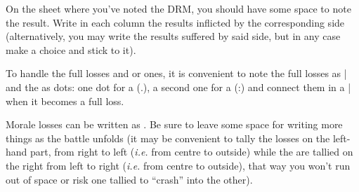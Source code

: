 \begin{playtip}
  On the sheet where you've noted the DRM, you should have some space to note
  the result. Write in each column the results inflicted by the corresponding
  side (alternatively, you may write the results suffered by said side, but in
  any case make a choice and stick to it).

  To handle the full losses and \texttu or \texttd ones, it is convenient to
  note the full losses as | and the  as dots: one dot for a \texttu
  (.), a second one for a \texttd (:) and connect them in a | when it becomes
  a full loss.

  Morale losses can be written as \textetoile. Be sure to leave some space for
  writing more things as the battle unfolds (it may be convenient to tally the
  losses on the left-hand part, from right to left (\emph{i.e.} from centre to
  outside) while the \textetoile are tallied on the right from left to right
  (\emph{i.e.} from centre to outside), that way you won't run out of space or
  risk one tallied to ``crash'' into the other).
\end{playtip}

\newcommand{\chMilBattleRoll}[4][]{\bparag[#4.] Both sides roll for #4 of
  the #2 day. \ifx#1\relax\else At sea, the side that suffered the most
  \textetoile previously in this battle has a \bonus{-1} DRM (note that this
  is \textbf{not} necessarily the side with less Morale or less remaining
  Morale); in case of tie, nobody gets the malus.\fi #3 results.}
\newcommand{\chMilFireRoll}[3][]{\chMilBattleRoll[#1]{#2}{#3}{Fire}}
\newcommand{\chMilFireTech}{
  \bparag[Technology.] A Stack with \TMED technology does not roll for
  Fire. On the European map, stack with \TREN technology and no \ARMY counter
  does not roll for Fire. A stack with \TREN technology only apply the
  \textetoile. A stack with \TARQ technology only does half (round down to
  lesser \texttu) the indicated losses. A stack with \NGD and no \VGD only
  does half (round up to larger \texttu) the indicated losses.}
\newcommand{\chMilMoraleCheck}{
  \bparag[Rout.] If one side has suffered more \textetoile than its
  \terme{Morale}, it is immediately routed. It loses the battle and its
  opponent wins it. Go to~\ref{chMilitary:Battle:Pursuit}.}
\newcommand{\chMilWindAdvRetreat}{
  \bparag[Retreat.] At sea (only), the side with \terme{Wind advantage} may
  decide to retreat. If it does, it loses the battle and its opponent wins it
  the but there is no pursuit. Go directly to~\ref{chMilitary:Battle:Loss
    modifications}.}
\newcommand{\chMilShockRoll}[1]{\chMilBattleRoll[t]{#1}{Tally}{Shock}}

